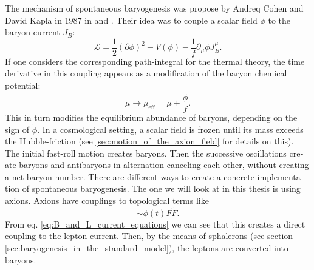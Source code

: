 \documentclass[master,       %
               twoside,        %
               BCOR10mm,       %
               english,ngerman, %
               ]{GAUBM}
\begin{document}
\begin{otherlanguage}{english}
The mechanism of spontaneous baryogenesis was propose by Andreq Cohen and David Kapla in 1987 in \cite{COHEN1987251} and \cite{COHEN1988913}.
Their idea was to couple a scalar field $\phi$ to the baryon current $J_B$:
\begin{equation}
	\mathcal{L} = \frac{1}{2} (\partial \phi)^2 - V(\phi) - \frac{1}{f} \partial_\mu \phi J_B^\mu.
\end{equation}
If one considers the corresponding path-integral for the thermal theory, the time derivative in this coupling appears as a modification of the baryon chemical potential:
\begin{equation}
	\mu \to \mu_\mathrm{eff} = \mu + \frac{\dot{\phi}}{f}.
\end{equation}
This in turn modifies the equilibrium abundance of baryons, depending on the sign of $\dot{\phi}$.
In a cosmological setting, a scalar field is frozen until its mass exceeds the Hubble-friction (see \ref{sec:motion_of_the_axion_field} for details on this). The initial fast-roll motion creates baryons. Then the successive oscillations create baryons and antibaryons in alternation canceling each other, without creating a net baryon number.
There are different ways to create a concrete implementation of spontaneous baryogenesis.
The one we will look at in this thesis is using axions.
Axions have couplings to topological terms like
\begin{equation}
	 \sim \phi(t) F \tilde{F}.
\end{equation}
From eq. \eqref{eq:B_and_L_current_equations} we can see that this creates a direct coupling to the lepton current.
Then, by the means of sphalerons (see section \ref{sec:baryogenesis_in_the_standard_model}), the leptons are converted into baryons.


\end{otherlanguage}
\end{document}
